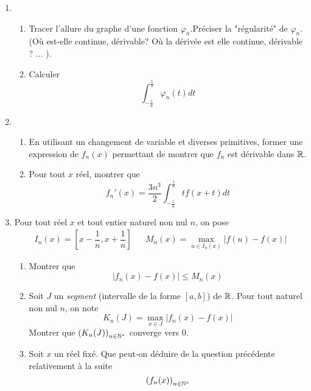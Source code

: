 \begin{enumerate}
 \item \begin{enumerate}
 \item Tracer l'allure du graphe d'une fonction $\varphi_n$.\newline Préciser la "régularité" de $\varphi_n$. (Où est-elle continue, dérivable? Où la dérivée est elle continue, dérivable ? ... ).
\item Calculer
\begin{displaymath}
 \int_{-\frac{1}{n}}^{\frac{1}{n}}\varphi_n(t)dt
\end{displaymath}
\end{enumerate}
\item \begin{enumerate}
 \item En utilisant un changement de variable et diverses primitives, former une expression de $f_n(x)$ permettant de montrer que $f_n$ est dérivable dans $\mathbb{R}$.
\item Pour tout $x$ réel, montrer que
\begin{displaymath}
 f_n'(x) = \dfrac{3n^3}{2}\int_{-\frac{1}{n}}^{\frac{1}{n}}tf(x+t)dt
\end{displaymath}
\end{enumerate}
\item Pour tout réel $x$ et tout entier naturel non nul $n$, on pose
\begin{align*}
 I_n(x)= \left[ x-\dfrac{1}{n}, x+\dfrac{1}{n}\right] & &
M_n(x) = \max_{u\in I_n(x)} |f(u)-f(x)|
\end{align*}
\begin{enumerate}
 \item Montrer que \begin{displaymath}
|f_n(x)-f(x)|\leq M_n(x) 
\end{displaymath}
\item Soit $J$ un \emph{segment} (intervalle de la forme $[a,b]$) de $\mathbb{R}$. Pour tout naturel non nul $n$, on note
\begin{displaymath}
 K_n(J) = \max_{x\in J}|f_n(x)-f(x)|
\end{displaymath}
Montrer que $\left(K_n(J) \right)_{n\in\mathbb{N}^*}$ converge vers $0$.
\item Soit $x$ un réel fixé. Que peut-on déduire de la question précédente relativement à la suite
\begin{displaymath}
 \left(f_n(x) \right)_{n\in\mathbb{N}^*}
\end{displaymath}
\end{enumerate}

\end{enumerate}
